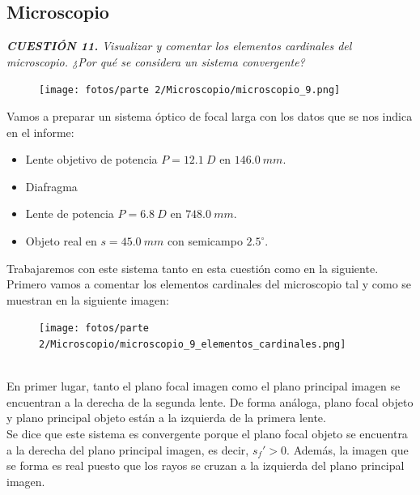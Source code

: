 \documentclass[11pt]{article}
\begin{document}
    \vspace{0.6cm}
    \subsection{Microscopio}
    \textit{\textbf{CUESTIÓN 11.} Visualizar y comentar los elementos cardinales del microscopio. ¿Por qué se considera un sistema convergente?}\\

    \begin{figure}
        \vspace{-0.7cm}
        \centering
        \texttt{[image: fotos/parte 2/Microscopio/microscopio\_9.png]}
    \end{figure}
    
    \noindent Vamos a preparar un sistema óptico de focal larga con los datos que se nos indica en el informe:
    \begin{itemize}
        \item Lente objetivo de potencia $P = 12.1\ D$ en $146.0\ mm$.
        \item Diafragma
        \item Lente de potencia $P = 6.8\ D$ en $748.0\ mm$.
        \item Objeto real en $s = 45.0\ mm$ con semicampo $2.5^\circ$.
    \end{itemize}

    \clearpage
    \noindent Trabajaremos con este sistema tanto en esta cuestión como en la siguiente. Primero vamos a comentar los elementos cardinales del microscopio tal y como se muestran en la siguiente imagen:
    \\
    \begin{figure}[ht]
        \centering
        \texttt{[image: fotos/parte 2/Microscopio/microscopio\_9\_elementos\_cardinales.png]}
        \label{fig:microscopio_9_elementos_cardinales}
    \end{figure}
    \\
    
    \noindent En primer lugar, tanto el plano focal imagen como el plano principal imagen se encuentran a la derecha de la segunda lente. De forma análoga, plano focal objeto y plano principal objeto están a la izquierda de la primera lente.
    \\
    
    \noindent Se dice que este sistema es convergente porque el plano focal objeto se encuentra a la derecha del plano principal imagen, es decir, $s_f' > 0$. Además, la imagen que se forma es real puesto que los rayos se cruzan a la izquierda del plano principal imagen.
    \\
\end{document}
